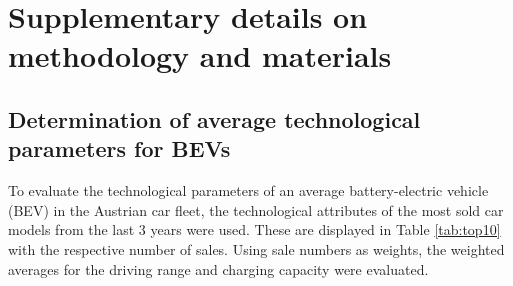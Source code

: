\documentclass[journal,article,submit,pdftex,moreauthors]{Definitions/mdpi}
\begin{document}
\appendix
\section[\appendixname~\thesection]{Supplementary details on methodology and materials \label{app:param}} 
\subsection[\appendixname~\thesubsection]{Determination of average technological parameters for BEVs}

To evaluate the technological parameters of an average battery-electric vehicle (BEV) in the Austrian car fleet, the technological attributes of the most sold car models from the last 3 years were used. These are displayed in Table \ref{tab:top10} with the respective number of sales. Using sale numbers as weights, the weighted averages for the driving range and charging capacity were evaluated.
\end{document}
